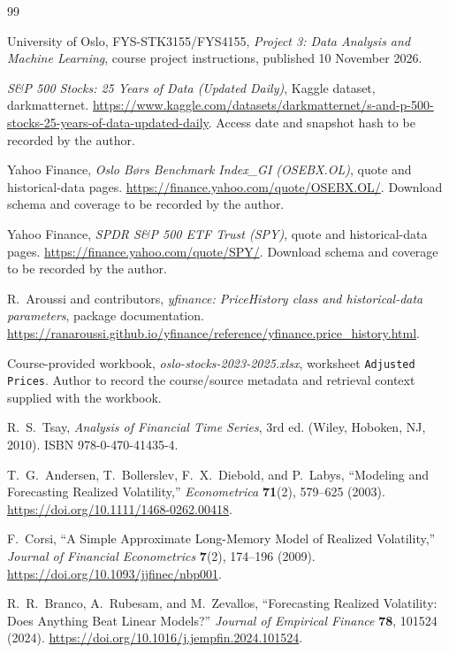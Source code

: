 \documentclass[11pt,a4paper]{article}
\begin{document}
\begin{thebibliography}{99}

University of Oslo, FYS-STK3155/FYS4155,
\emph{Project 3: Data Analysis and Machine Learning},
course project instructions, published 10 November 2026.

\emph{S\&P 500 Stocks: 25 Years of Data (Updated Daily)},
Kaggle dataset, darkmatternet.
\url{https://www.kaggle.com/datasets/darkmatternet/s-and-p-500-stocks-25-years-of-data-updated-daily}.
Access date and snapshot hash to be recorded by the author.

Yahoo Finance,
\emph{Oslo B\o rs Benchmark Index\_GI (OSEBX.OL)},
quote and historical-data pages.
\url{https://finance.yahoo.com/quote/OSEBX.OL/}.
Download schema and coverage to be recorded by the author.

Yahoo Finance,
\emph{SPDR S\&P 500 ETF Trust (SPY)},
quote and historical-data pages.
\url{https://finance.yahoo.com/quote/SPY/}.
Download schema and coverage to be recorded by the author.

R.~Aroussi and contributors,
\emph{yfinance: PriceHistory class and historical-data parameters},
package documentation.
\url{https://ranaroussi.github.io/yfinance/reference/yfinance.price_history.html}.

Course-provided workbook,
\emph{oslo-stocks-2023-2025.xlsx},
worksheet \texttt{Adjusted Prices}.
Author to record the course/source metadata and retrieval context supplied with the workbook.

R.~S.~Tsay,
\emph{Analysis of Financial Time Series}, 3rd ed.
(Wiley, Hoboken, NJ, 2010).
ISBN 978-0-470-41435-4.

T.~G.~Andersen, T.~Bollerslev, F.~X.~Diebold, and P.~Labys,
``Modeling and Forecasting Realized Volatility,''
\emph{Econometrica} \textbf{71}(2), 579--625 (2003).
\url{https://doi.org/10.1111/1468-0262.00418}.

F.~Corsi,
``A Simple Approximate Long-Memory Model of Realized Volatility,''
\emph{Journal of Financial Econometrics} \textbf{7}(2), 174--196 (2009).
\url{https://doi.org/10.1093/jjfinec/nbp001}.

R.~R.~Branco, A.~Rubesam, and M.~Zevallos,
``Forecasting Realized Volatility: Does Anything Beat Linear Models?''
\emph{Journal of Empirical Finance} \textbf{78}, 101524 (2024).
\url{https://doi.org/10.1016/j.jempfin.2024.101524}.


\end{thebibliography}
\end{document}
